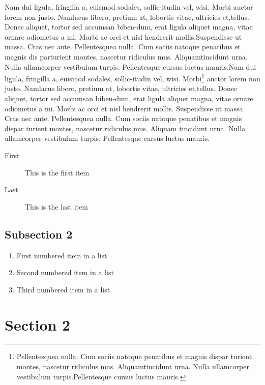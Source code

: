 \documentclass[10pt, a4paper, twocolumn]{book}
\begin{document}
Nam dui ligula, fringilla a, euismod sodales, sollic-itudin vel, wisi. Morbi auctor lorem non justo.\vspace{17\baselineskip} Namlacus libero, pretium at, lobortis vitae, ultricies et,tellus. Donec aliquet, tortor sed accumsan biben-dum, erat ligula aliquet magna, vitae ornare odiometus a mi.  Morbi ac orci et nisl hendrerit mollis.Suspendisse ut massa. Cras nec ante. Pellentesquea nulla. Cum sociis natoque penatibus et magnis dis parturient montes, nascetur ridiculus mus. Aliquamtincidunt urna. Nulla ullamcorper vestibulum turpis. Pellentesque cursus luctus mauris.Nam dui ligula, fringilla a, euismod sodales, sollic-itudin vel, wisi. Morbi\footnote{ Pellentesquea nulla. Cum sociis natoque penatibus et magnis dispar turient montes, nascetur ridiculus mus. Aliquamtincidunt urna. Nulla ullamcorper vestibulum turpis.Pellentesque cursus luctus mauris.} auctor lorem non justo. Namlacus libero, pretium at, lobortis vitae, ultricies et,tellus. Donec aliquet, tortor sed accumsan biben-dum, erat ligula aliquet magna, vitae ornare odiometus a mi. Morbi ac orci et nisl hendrerit mollis. Suspendisse ut massa. Cras nec ante. Pellentesquea nulla. Cum sociis natoque penatibus et magnis dispar turient montes, nascetur ridiculus mus. Aliquam tincidunt urna. Nulla ullamcorper vestibulum turpis. Pellentesque cursus luctus mauris. 


\begin{description}
	\item[First] This is the first item
	\item[Last] This is the last item
\end{description}


\subsection{Subsection 2}

\lipsum[5]

\begin{enumerate}
	\item First numbered item in a list
	\item Second numbered item in a list
	\item Third numbered item in a list
\end{enumerate}


\section{Section 2}
\end{document}
